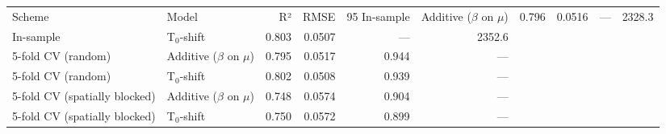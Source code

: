 \begin{tabular}{llrrrr}
\toprule
Scheme & Model & R² & RMSE & 95%
\midrule
In-sample & Additive ($\beta$ on $\mu$) & 0.796 & 0.0516 & — & 2328.3 \\
In-sample & T$_0$-shift & 0.803 & 0.0507 & — & 2352.6 \\
5-fold CV (random) & Additive ($\beta$ on $\mu$) & 0.795 & 0.0517 & 0.944 & — \\
5-fold CV (random) & T$_0$-shift & 0.802 & 0.0508 & 0.939 & — \\
5-fold CV (spatially blocked) & Additive ($\beta$ on $\mu$) & 0.748 & 0.0574 & 0.904 & — \\
5-fold CV (spatially blocked) & T$_0$-shift & 0.750 & 0.0572 & 0.899 & — \\
\bottomrule
\end{tabular}
